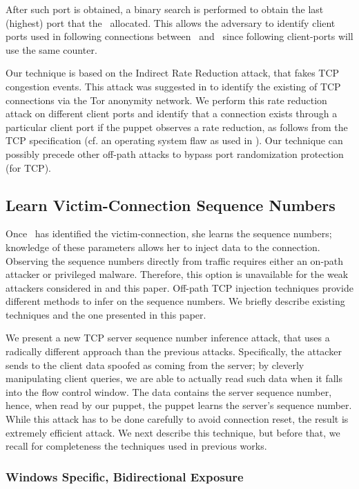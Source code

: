 \documentclass[conference]{IEEEtran}
\begin{document}
After such port is obtained, a binary search is performed to obtain the last (highest) port that the \wini\ allocated. This allows the adversary to identify client ports used in following connections between \wini\ and \lin\ since following client-ports will use the same counter.

Our technique is based on the Indirect Rate Reduction attack, that fakes TCP congestion events. This attack was suggested in \cite{SpyingInTheDark} to identify the existing of TCP connections via the Tor anonymity network.
We perform this rate reduction attack on different client ports and identify that a connection exists through a particular client port if the puppet observes a rate reduction, as follows from the TCP specification (cf. an operating system flaw as used in \cite{woottcp}). Our technique can possibly precede other off-path attacks to bypass port randomization protection (for TCP). 


\subsection{Learn Victim-Connection Sequence Numbers}

Once \mal\ has identified the victim-connection, she learns the sequence numbers; knowledge of these parameters allows her to inject data to the connection. 
Observing the sequence numbers directly from traffic requires either an on-path attacker or privileged malware. Therefore, this option is unavailable for the weak attackers considered in \cite{lkm:phrack:07,woottcp,snptcp} and this paper. Off-path TCP injection techniques provide different methods to infer on the sequence numbers. We briefly describe existing techniques and the one presented in this paper.

We present a new TCP server sequence number inference attack, that uses a radically different approach than the previous attacks. Specifically, the attacker sends to the client  data spoofed as coming from the server; by cleverly manipulating client queries, we are able to actually read such data when it falls into the flow control window. The data contains the server sequence number, hence, when read by our puppet, the puppet learns the server's sequence number. While this attack has to be done carefully to avoid connection reset, the result is extremely efficient attack. We next describe this technique, but before that, we recall for completeness the techniques used in previous works. 


\subsubsection{Windows Specific, Bidirectional Exposure}
\end{document}
